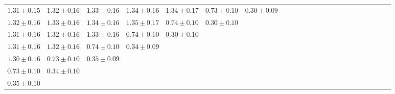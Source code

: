 \begin{table}[ht]
{{\begin{adjustbox}{width=\textwidth}
\begin{tabular}{ccccccccccccccccccccccc}
$1.31 \pm 0.15$ & $1.32 \pm 0.16$ & $1.33 \pm 0.16$ & $1.34 \pm 0.16$ & $1.34 \pm 0.17$ & $0.73 \pm 0.10$ & $0.30 \pm 0.09$ &  &  &  &  &  &  &  &  &  &  &  &  &  &  &  &  \\
$1.32 \pm 0.16$ & $1.33 \pm 0.16$ & $1.34 \pm 0.16$ & $1.35 \pm 0.17$ & $0.74 \pm 0.10$ & $0.30 \pm 0.10$ &  &  &  &  &  &  &  &  &  &  &  &  &  &  &  &  &  \\
$1.31 \pm 0.16$ & $1.32 \pm 0.16$ & $1.33 \pm 0.16$ & $0.74 \pm 0.10$ & $0.30 \pm 0.10$ &  &  &  &  &  &  &  &  &  &  &  &  &  &  &  &  &  &  \\
$1.31 \pm 0.16$ & $1.32 \pm 0.16$ & $0.74 \pm 0.10$ & $0.34 \pm 0.09$ &  &  &  &  &  &  &  &  &  &  &  &  &  &  &  &  &  &  &  \\
$1.30 \pm 0.16$ & $0.73 \pm 0.10$ & $0.35 \pm 0.09$ &  &  &  &  &  &  &  &  &  &  &  &  &  &  &  &  &  &  &  &  \\
$0.73 \pm 0.10$ & $0.34 \pm 0.10$ &  &  &  &  &  &  &  &  &  &  &  &  &  &  &  &  &  &  &  &  &  \\
$0.35 \pm 0.10$ &  &  &  &  &  &  &  &  &  &  &  &  &  &  &  &  &  &  &  &  &  &  \\

\end{tabular}
\end{adjustbox}
}
}

\end{table}
